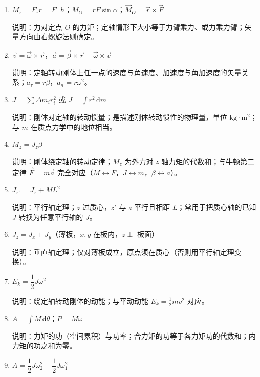 \documentclass[12pt,a4paper]{ctexart}
\begin{document}
\begin{enumerate}[leftmargin=3em,label=\textbf{公式\arabic*}：,ref=公式\arabic*]

    \item $M_z = F_\tau r = F_\perp h$；$M_O = rF\sin\alpha$；$\vec{M}_O = \vec{r}\times\vec{F}$

    说明：力对定点 $O$ 的力矩；定轴情形下大小等于力臂乘力、或力乘力臂；矢量方向由右螺旋法则确定。

    \item $\vec{v} = \vec{\omega}\times\vec{r}$，$\vec{a} = \vec{\beta}\times\vec{r} + \vec{\omega}\times\vec{v}$

    说明：定轴转动刚体上任一点的速度与角速度、加速度与角加速度的矢量关系；$a_\tau = r\beta$，$a_n = r\omega^2$。

    \item $J = \sum \Delta m_i r_i^2$ 或 $J = \int r^2\,\mathrm{d}m$

    说明：刚体对定轴的转动惯量；是描述刚体转动惯性的物理量，单位 $\mathrm{kg\cdot m^2}$；与 $m$ 在质点力学中的地位相当。

    \item $M_z = J_z\beta$

    说明：刚体绕定轴的转动定律；$M_z$ 为外力对 $z$ 轴力矩的代数和；与牛顿第二定律 $\vec{F}=m\vec{a}$ 完全对应（$M\leftrightarrow F$，$J\leftrightarrow m$，$\beta\leftrightarrow a$）。

    \item $J_{z'} = J_z + ML^2$

    说明：平行轴定理；$z$ 过质心，$z'$ 与 $z$ 平行且相距 $L$；常用于把质心轴的已知 $J$ 转换为任意平行轴的 $J$。

    \item $J_z = J_x + J_y$（薄板，$x,y$ 在板内，$z\perp$ 板面）

    说明：垂直轴定理；仅对薄板成立，原点须在质心（否则用平行轴定理变换）。

    \item $E_k = \dfrac{1}{2}J\omega^2$

    说明：绕定轴转动刚体的动能；与平动动能 $E_k=\frac{1}{2}mv^2$ 对应。

    \item $A = \int M\,\mathrm{d}\theta$；$P = M\omega$

    说明：力矩的功（空间累积）与功率；合力矩的功等于各力矩功的代数和；内力矩的功之和为零。

    \item $A = \dfrac{1}{2}J\omega_2^2 - \dfrac{1}{2}J\omega_1^2$


\end{enumerate}
\end{document}

